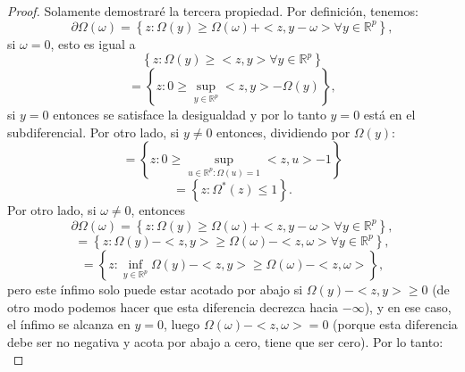 \documentclass[12pt,draftcls, onecolumn, letterpaper,compsoc]{IEEEtran}
\begin{document}
\begin{proof}
    Solamente demostrar\'{e} la tercera propiedad. Por definici\'{o}n, tenemos:
    \begin{displaymath}
        \partial\Omega(\omega) = \left\lbrace z : \Omega(y) \geq \Omega(\omega) + <z,y-\omega> \forall y\in\mathbb{R}^{p}\right\rbrace,
    \end{displaymath}
    si $\omega=0$, esto es igual a
    \begin{displaymath}
        \left\lbrace z : \Omega(y) \geq  <z,y> \forall y\in\mathbb{R}^{p}\right\rbrace
    \end{displaymath}
    \begin{displaymath}
        =\left\lbrace z : 0\geq \sup_{y\in \mathbb{R}^{p}}<z,y>-\Omega(y) \right\rbrace,
    \end{displaymath}
    si $y=0$ entonces se satisface la desigualdad y por lo tanto $y=0$ est\'{a} en el subdiferencial.  Por otro lado, si $y\neq 0$ entonces, dividiendo por $\Omega(y)$:
    \begin{displaymath}
        =\left\lbrace z : 0 \geq  \sup_{u\in \mathbb{R}^{p}:\Omega(u)=1}<z,u> -1 \right\rbrace
    \end{displaymath}
    \begin{displaymath}
        =\left\lbrace z : \Omega^{*}(z) \leq 1 \right\rbrace.
    \end{displaymath}
    Por otro lado, si $\omega\neq 0$, entonces
    \begin{displaymath}
        \partial\Omega(\omega) = \left\lbrace z : \Omega(y) \geq \Omega(\omega) + <z,y-\omega> \forall y\in\mathbb{R}^{p}\right\rbrace,
    \end{displaymath}
    \begin{displaymath}
        = \left\lbrace z : \Omega(y) -<z, y> \geq \Omega(\omega) - <z,\omega> \forall y\in\mathbb{R}^{p}\right\rbrace,
    \end{displaymath}
    \begin{displaymath}
        = \left\lbrace z : \inf_{y\in\mathbb{R}^{p}} \Omega(y) -<z, y> \geq \Omega(\omega) - <z,\omega> \right\rbrace,
    \end{displaymath}
    pero este \'{i}nfimo solo puede estar acotado por abajo si $\Omega(y) -<z, y> \geq 0$ (de otro modo podemos hacer que esta diferencia decrezca hacia $-\infty$), y en ese caso,
    el \'{i}nfimo se alcanza en $y=0$, luego $\Omega(\omega) - <z,\omega>=0$ (porque esta diferencia debe ser no negativa y acota por abajo a cero, tiene que ser cero). Por lo tanto:\\

\end{proof}
\end{document}
